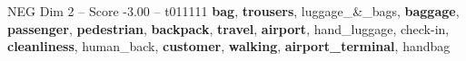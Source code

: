 \begin{textsample}{NEG Dim 2 – Score -3.00 – t011111}  \label{ex:f2_neg_031}
\textbf{bag}, \textbf{trousers}, luggage\_\&\_bags, \textbf{baggage}, \textbf{passenger}, \textbf{pedestrian}, \textbf{backpack}, \textbf{travel}, \textbf{airport}, hand\_luggage, check-in, \textbf{cleanliness}, human\_back, \textbf{customer}, \textbf{walking}, \textbf{airport\_terminal}, handbag

\end{textsample}
